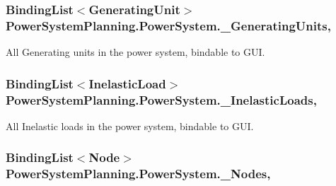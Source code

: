 \subsubsection[{\texorpdfstring{\+\_\+\+Generating\+Units}{_GeneratingUnits}}]{\setlength{\rightskip}{0pt plus 5cm}Binding\+List$<${\bf Generating\+Unit}$>$ Power\+System\+Planning.\+Power\+System.\+\_\+\+Generating\+Units\hspace{0.3cm}{\ttfamily [get]}, {}}\hypertarget{class_power_system_planning_1_1_power_system_af58aafa6a09ec68a492ea650e587ee36}{}\label{class_power_system_planning_1_1_power_system_af58aafa6a09ec68a492ea650e587ee36}


All Generating units in the power system, bindable to G\+UI. 

\subsubsection[{\texorpdfstring{\+\_\+\+Inelastic\+Loads}{_InelasticLoads}}]{\setlength{\rightskip}{0pt plus 5cm}Binding\+List$<${\bf Inelastic\+Load}$>$ Power\+System\+Planning.\+Power\+System.\+\_\+\+Inelastic\+Loads\hspace{0.3cm}{\ttfamily [get]}, {}}\hypertarget{class_power_system_planning_1_1_power_system_a00de0d9b9439f8b3ec25b1ac020a503d}{}\label{class_power_system_planning_1_1_power_system_a00de0d9b9439f8b3ec25b1ac020a503d}


All Inelastic loads in the power system, bindable to G\+UI. 

\subsubsection[{\texorpdfstring{\+\_\+\+Nodes}{_Nodes}}]{\setlength{\rightskip}{0pt plus 5cm}Binding\+List$<${\bf Node}$>$ Power\+System\+Planning.\+Power\+System.\+\_\+\+Nodes\hspace{0.3cm}{\ttfamily [get]}, {}}\hypertarget{class_power_system_planning_1_1_power_system_afe8041cf92b81053ffc54c1ab2cd76cc}{}\label{class_power_system_planning_1_1_power_system_afe8041cf92b81053ffc54c1ab2cd76cc}


